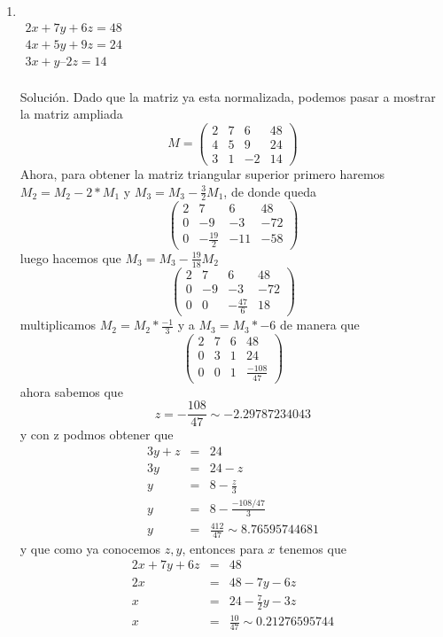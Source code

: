 \documentclass[11pt]{article}
\begin{document}
\begin{multicols}{2}
	\begin{enumerate}[\bf{Sistema} 1]
		\item 
			\ \\$\begin{matrix}
				2x + 7y + 6z = 48 \\
				4x + 5y + 9z = 24 \\
				3x +  y – 2z = 14 \\
			\end{matrix}$
		
			Soluci\'on. Dado que la matriz ya esta normalizada, podemos pasar a mostrar la matriz ampliada
				$$M = \left(\begin{array}{rrrr}
						2 & 7 & 6 & 48 \\
						4 & 5 & 9 & 24 \\
						3 & 1 & -2 & 14
					\end{array}\right)$$
			Ahora, para obtener la matriz triangular superior primero haremos $M_2 = M_2 - 2*M_1$ y $M_3 = M_3 - \frac{3}{2}M_1$, de donde queda 
				$$\left(\begin{array}{rrrr}
						2 & 7 & 6 & 48 \\
						0 & -9 & -3 & -72 \\
						0 & -\frac{19}{2} & -11 & -58
					\end{array}\right)$$
			luego hacemos que $M_3 = M_3 - \frac{19}{18} M_2$
				$$\left(\begin{array}{rrrr}
						2 & 7 & 6 & 48 \\
						0 & -9 & -3 & -72 \\
						0 & 0 & -\frac{47}{6} & 18
					\end{array}\right)$$
			multiplicamos $M_2 = M_2* \frac{-1}{3}$ y a $M_3 = M_3*-6$ de manera que
				$$\left(\begin{array}{rrrr}
					2 & 7 & 6 & 48 \\
					0 & 3 & 1 & 24 \\
					0 & 0 & 1 & \frac{-108}{47}
				\end{array}\right)$$
			ahora sabemos que $$z = -\frac{108}{47} \sim -2.29787234043$$ y con z  podmos obtener que
				\begin{eqnarray*}
					3y + z &=& 24 \\
					3y &=& 24 - z \\
					y &=& 8- \frac{z}{3} \\
					y &=& 8 - \frac{-108/47}{3} \\
					y &=& \frac{412}{47} \sim 8.76595744681
				\end{eqnarray*}
			y que como ya conocemos $z,y$, entonces para $x$ tenemos que
				\begin{eqnarray*}
					2x + 7y + 6z &=& 48 \\
					2x &=& 48 - 7y - 6z \\
					x  &=& 24 - \frac{7}{2}y - 3z \\
					x  &=& \frac{10}{47} \sim 0.21276595744
				\end{eqnarray*}


\end{enumerate}
\end{multicols}
\end{document}
